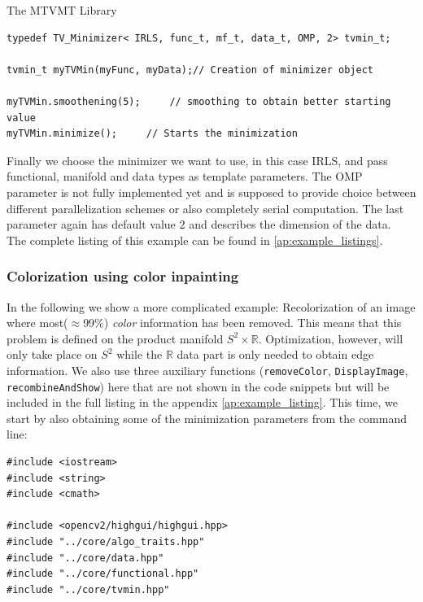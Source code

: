 \begin{chapter}{The MTVMT Library}
\cppinline
\begin{lstlisting}[label=code:tut_data,caption={Choosing the minimizer, smoothing and minimization}]
typedef TV_Minimizer< IRLS, func_t, mf_t, data_t, OMP, 2> tvmin_t;

tvmin_t myTVMin(myFunc, myData);// Creation of minimizer object

myTVMin.smoothening(5);		// smoothing to obtain better starting value
myTVMin.minimize();		// Starts the minimization
\end{lstlisting}

Finally we choose the minimizer we want to use, in this case IRLS, and pass functional, manifold and data types as template parameters. The OMP parameter is not fully implemented yet 
and is supposed to provide choice between different parallelization schemes or also completely serial computation. The last parameter again has default value $2$ and describes the 
dimension of the data.\\
The complete listing of this example can be found in \ref{ap:example_listings}.

\subsubsection{Colorization using color inpainting} %
\label{ssub:Color inpainting}
In the following we show a more complicated example: Recolorization of an image where most($\approx$99\%) \textit{color} information has been removed. This means that this
problem is defined on the product manifold $S^2\times \mathbb{R}$. Optimization, however, will only take place on $S^2$ while the $\mathbb{R}$ data part is only needed to obtain
edge information. We also use three auxiliary functions (\texttt{removeColor}, \texttt{DisplayImage}, \texttt{recombineAndShow}) here that are not shown in the code snippets but
will be included in the full listing in the appendix \ref{ap:example_listing}. This time, we start by also obtaining some of the minimization parameters from the command line:\\

\cppinline
\begin{lstlisting}[label=code:tut2_init,caption={Include library files and read parameters from standard input}]
#include <iostream>
#include <string>
#include <cmath>

#include <opencv2/highgui/highgui.hpp>
#include "../core/algo_traits.hpp"
#include "../core/data.hpp"
#include "../core/functional.hpp"
#include "../core/tvmin.hpp"


\end{lstlisting}
\end{chapter}
